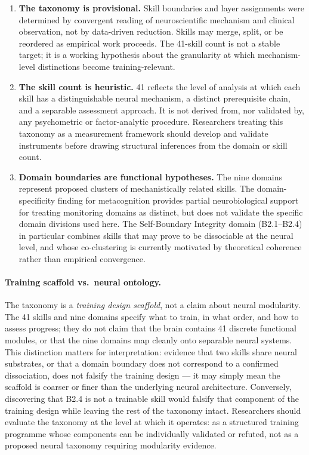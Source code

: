\documentclass[12pt, a4paper]{article}
\begin{document}
\begin{enumerate}[leftmargin=2em]
\item \textbf{The taxonomy is provisional.} Skill boundaries and layer assignments
were determined by convergent reading of neuroscientific mechanism and clinical
observation, not by data-driven reduction. Skills may merge, split, or be reordered
as empirical work proceeds. The 41-skill count is not a stable target; it is a
working hypothesis about the granularity at which mechanism-level distinctions
become training-relevant.

\item \textbf{The skill count is heuristic.} 41 reflects the level of analysis
at which each skill has a distinguishable neural mechanism, a distinct prerequisite
chain, and a separable assessment approach. It is not derived from, nor validated
by, any psychometric or factor-analytic procedure. Researchers treating this
taxonomy as a measurement framework should develop and validate instruments before
drawing structural inferences from the domain or skill count.

\item \textbf{Domain boundaries are functional hypotheses.} The nine domains
represent proposed clusters of mechanistically related skills. The domain-specificity
finding for metacognition \citep{morales2018, fleming2014} provides partial
neurobiological support for treating monitoring domains as distinct, but does not
validate the specific domain divisions used here. The Self-Boundary Integrity
domain (B2.1--B2.4) in particular combines skills that may prove to be dissociable
at the neural level, and whose co-clustering is currently motivated by theoretical
coherence rather than empirical convergence.
\end{enumerate}

\paragraph{Training scaffold vs.\ neural ontology.}
The taxonomy is a \emph{training design scaffold}, not a claim about neural
modularity. The 41 skills and nine domains specify what to train, in what order,
and how to assess progress; they do not claim that the brain contains 41 discrete
functional modules, or that the nine domains map cleanly onto separable neural
systems. This distinction matters for interpretation: evidence that two skills share
neural substrates, or that a domain boundary does not correspond to a confirmed
dissociation, does not falsify the training design --- it may simply mean the
scaffold is coarser or finer than the underlying neural architecture. Conversely,
discovering that B2.4 is not a trainable skill would falsify that component of the
training design while leaving the rest of the taxonomy intact. Researchers should
evaluate the taxonomy at the level at which it operates: as a structured training
programme whose components can be individually validated or refuted, not as a
proposed neural taxonomy requiring modularity evidence.
\end{document}
